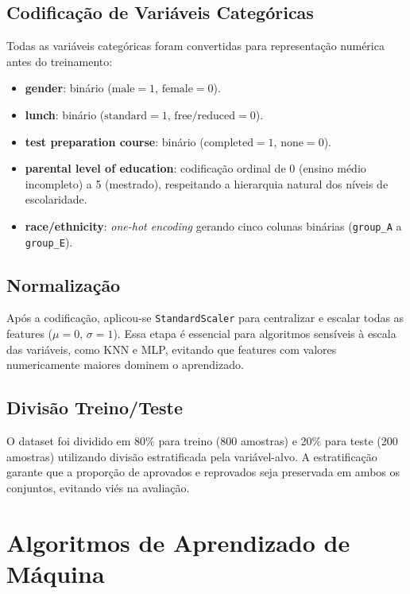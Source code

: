 \documentclass[12pt, a4paper]{article}
\begin{document}
\subsection{Codificação de Variáveis Categóricas}

Todas as variáveis categóricas foram convertidas para representação numérica
antes do treinamento:

\begin{itemize}
  \item \textbf{gender}: binário ($\text{male}=1$, $\text{female}=0$).
  \item \textbf{lunch}: binário ($\text{standard}=1$, $\text{free/reduced}=0$).
  \item \textbf{test preparation course}: binário ($\text{completed}=1$, $\text{none}=0$).
  \item \textbf{parental level of education}: codificação ordinal de 0 (ensino
  médio incompleto) a 5 (mestrado), respeitando a hierarquia natural dos
  níveis de escolaridade.
  \item \textbf{race/ethnicity}: \textit{one-hot encoding} gerando cinco
  colunas binárias (\texttt{group\_A} a \texttt{group\_E}).
\end{itemize}

\subsection{Normalização}

Após a codificação, aplicou-se \texttt{StandardScaler} para centralizar e
escalar todas as features ($\mu=0$, $\sigma=1$). Essa etapa é essencial para
algoritmos sensíveis à escala das variáveis, como KNN e MLP, evitando que
features com valores numericamente maiores dominem o aprendizado.

\subsection{Divisão Treino/Teste}

O dataset foi dividido em 80\% para treino (800 amostras) e 20\% para
teste (200 amostras) utilizando divisão estratificada pela variável-alvo.
A estratificação garante que a proporção de aprovados e reprovados seja
preservada em ambos os conjuntos, evitando viés na avaliação.

\section{Algoritmos de Aprendizado de Máquina}
\end{document}
